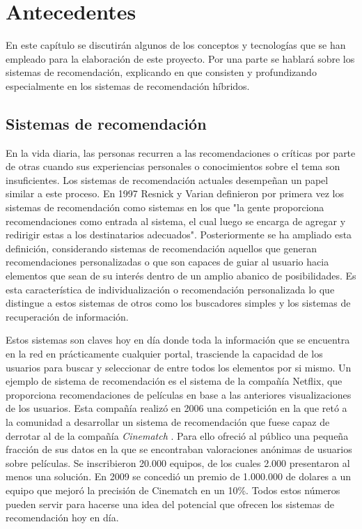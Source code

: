\chapter{Antecedentes}
\label{chap:antecedentes}

En este capítulo se discutirán algunos de los conceptos y tecnologías que se han empleado para la elaboración de este proyecto. Por una parte se hablará sobre los sistemas de recomendación, explicando en que consisten y profundizando especialmente en los sistemas de recomendación híbridos. 

\section{Sistemas de recomendación}
En la vida diaria, las personas recurren a las recomendaciones o críticas por parte de otras cuando sus experiencias personales o conocimientos sobre el tema son insuficientes.  Los sistemas de recomendación actuales desempeñan un papel similar a este proceso. En 1997 Resnick y Varian \cite{Resnick:1997:RS:245108.245121} definieron por primera vez los sistemas de recomendación como sistemas en los que "la gente proporciona recomendaciones como entrada al sistema, el cual luego se encarga de agregar y redirigir estas a los destinatarios adecuados". %
Posteriormente se ha ampliado esta definición, considerando sistemas de recomendación aquellos que generan recomendaciones personalizadas o que son capaces de guiar al usuario hacia elementos que sean de su interés dentro de un amplio abanico de posibilidades. Es esta característica de individualización o recomendación personalizada lo que distingue a estos sistemas de otros como los buscadores simples y los sistemas de recuperación de información.

Estos sistemas son claves hoy en día donde toda la información que se encuentra en la red en prácticamente cualquier portal, trasciende la capacidad de los usuarios para buscar y seleccionar de entre todos los elementos por si mismo. Un ejemplo de sistema de recomendación es el sistema de la compañía Netflix, que proporciona recomendaciones de películas en base a las anteriores visualizaciones de los usuarios. Esta compañía realizó en 2006 una competición en la que retó a la comunidad a desarrollar un sistema de recomendación que fuese capaz de derrotar al de la compañía \textit{Cinematch} \cite{Bennett:2007}. Para ello ofreció al público una pequeña fracción de sus datos en la que se encontraban valoraciones anónimas de usuarios sobre películas. Se inscribieron 20.000 equipos, de los cuales 2.000 presentaron al menos una solución. En 2009 se concedió un premio de 1.000.000 de dolares a un equipo que mejoró la precisión de Cinematch en un 10\%. Todos estos números pueden servir para hacerse una idea del potencial que ofrecen los sistemas de recomendación hoy en día.

